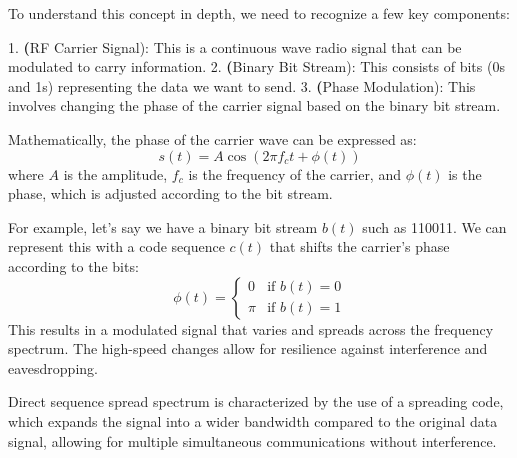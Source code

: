 To understand this concept in depth, we need to recognize a few key components:

1. \textbf(RF Carrier Signal): This is a continuous wave radio signal that can be modulated to carry information.
2. \textbf(Binary Bit Stream): This consists of bits (0s and 1s) representing the data we want to send.
3. \textbf(Phase Modulation): This involves changing the phase of the carrier signal based on the binary bit stream.

Mathematically, the phase of the carrier wave can be expressed as:
\[
s(t) = A \cos(2 \pi f_c t + \phi(t))
\]
where \(A\) is the amplitude, \(f_c\) is the frequency of the carrier, and \(\phi(t)\) is the phase, which is adjusted according to the bit stream.

For example, let’s say we have a binary bit stream \(b(t)\) such as 110011. We can represent this with a code sequence \(c(t)\) that shifts the carrier's phase according to the bits:
\[
\phi(t) = \begin{cases} 
0 & \text{if } b(t) = 0 \\ 
\pi & \text{if } b(t) = 1 
\end{cases}
\]
This results in a modulated signal that varies and spreads across the frequency spectrum. The high-speed changes allow for resilience against interference and eavesdropping.

Direct sequence spread spectrum is characterized by the use of a spreading code, which expands the signal into a wider bandwidth compared to the original data signal, allowing for multiple simultaneous communications without interference.

